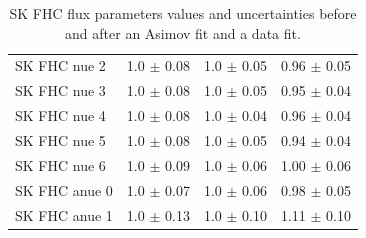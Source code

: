 \begin{table}[ht!]
\begin{tabular}{llll}
    \Gls{SK} \Gls{FHC} \Gls{nue} 2& 1.0 $\pm$ 0.08 & 1.0 $\pm$ 0.05 & 0.96 $\pm$ 0.05 \\ 
    \Gls{SK} \Gls{FHC} \Gls{nue} 3& 1.0 $\pm$ 0.08 & 1.0 $\pm$ 0.05 & 0.95 $\pm$ 0.04 \\ 
    \Gls{SK} \Gls{FHC} \Gls{nue} 4& 1.0 $\pm$ 0.08 & 1.0 $\pm$ 0.04 & 0.96 $\pm$ 0.04 \\ 
    \Gls{SK} \Gls{FHC} \Gls{nue} 5& 1.0 $\pm$ 0.08 & 1.0 $\pm$ 0.05 & 0.94 $\pm$ 0.04 \\ 
    \Gls{SK} \Gls{FHC} \Gls{nue} 6& 1.0 $\pm$ 0.09 & 1.0 $\pm$ 0.06 & 1.00 $\pm$ 0.06 \\ 
    \Gls{SK} \Gls{FHC} \Gls{anue} 0& 1.0 $\pm$ 0.07 & 1.0 $\pm$ 0.06 & 0.98 $\pm$ 0.05 \\ 
    \Gls{SK} \Gls{FHC} \Gls{anue} 1& 1.0 $\pm$ 0.13 & 1.0 $\pm$ 0.10 & 1.11 $\pm$ 0.10 \\ \bottomrule
  \end{tabular}
  \caption{\Gls{SK} \Gls{FHC} flux parameters values and uncertainties
    before and after an \Gls{Asimov} fit and a data fit.}
\end{table}



